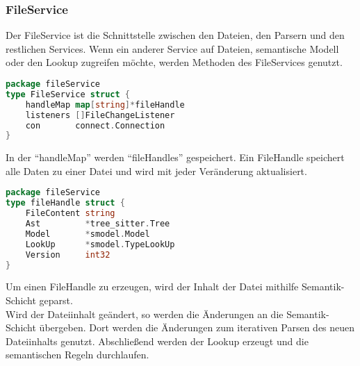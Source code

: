\documentclass[./einleitung.tex]{subfiles}
\begin{document}
    \subsubsection[FileService]{FileService }
    \label{subsubsec:file-service}
    Der FileService ist die Schnittstelle zwischen den Dateien, den Parsern und den restlichen Services.
    Wenn ein anderer Service auf Dateien, semantische Modell oder den Lookup zugreifen möchte, werden Methoden des FileServices genutzt.
    \begin{lstlisting}[language=Go]
package fileService
type FileService struct {
	handleMap map[string]*fileHandle
	listeners []FileChangeListener
	con       connect.Connection
}
    \end{lstlisting}
    In der ``handleMap'' werden ``fileHandles'' gespeichert.
    Ein FileHandle speichert alle Daten zu einer Datei und wird mit jeder Veränderung aktualisiert.
    \begin{lstlisting}[language=Go]
package fileService
type fileHandle struct {
	FileContent string
	Ast         *tree_sitter.Tree
	Model       *smodel.Model
	LookUp      *smodel.TypeLookUp
	Version     int32
}
    \end{lstlisting}
    Um einen FileHandle zu erzeugen, wird der Inhalt der Datei mithilfe Semantik-Schicht geparst.\\
    Wird der Dateiinhalt geändert, so werden die Änderungen an die Semantik-Schicht übergeben.
    Dort werden die Änderungen zum iterativen Parsen des neuen Dateiinhalts genutzt.
    Abschließend werden der Lookup erzeugt und die semantischen Regeln durchlaufen. \\
\end{document}
